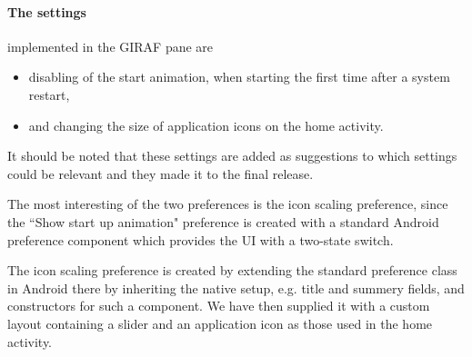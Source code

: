 \paragraph{The settings} implemented in the GIRAF pane are
\begin{itemize}
 	\item disabling of the start animation, when starting \launcher the first time after a system restart,
 	\item and changing the size of application icons on the home activity.
 \end{itemize} 
It should be noted that these settings are added as suggestions to which settings could be relevant and they made it to the final release.

The most interesting of the two preferences is the icon scaling preference, since the ``Show start up animation" preference is created with a standard Android preference component which provides the UI with a two-state switch.

The icon scaling preference is created by extending the standard preference class in Android there by inheriting the native setup, e.g. title and summery fields, and constructors for such a component. We have then supplied it with a custom layout containing a slider and an application icon as those used in the home activity.